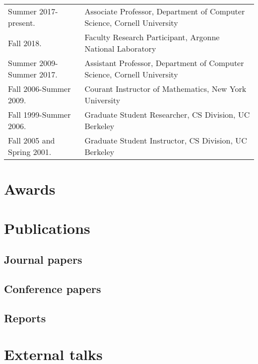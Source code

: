 \documentclass{article}
\begin{document}
\begin{tabular}{ll}
  Summer 2017-present.
    & Associate Professor, Department of Computer Science, Cornell University \\
  Fall 2018.
    & Faculty Research Participant, Argonne National Laboratory \\
  Summer 2009-Summer 2017.
    & Assistant Professor, Department of Computer Science,
      Cornell University \\
  Fall 2006-Summer 2009.
    & Courant Instructor of Mathematics, New York University \\
  Fall 1999-Summer 2006.
    & Graduate Student Researcher, CS Division, UC Berkeley \\
  Fall 2005 and Spring 2001.
    & Graduate Student Instructor, CS Division, UC Berkeley
\end{tabular}


\section*{Awards}




\section*{Publications}

\subsection*{Journal papers}



\subsection*{Conference papers}



\subsection*{Reports}




\section*{External talks}
\end{document}
